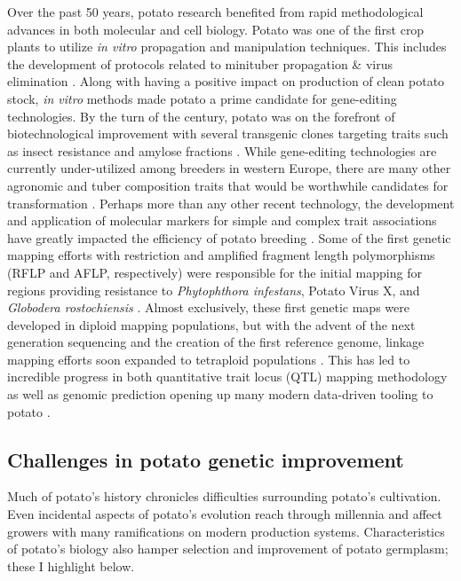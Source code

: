 \documentclass[
]{article}
\begin{document}
Over the past 50 years, potato research benefited from rapid
methodological advances in both molecular and cell biology. Potato was
one of the first crop plants to utilize \emph{in vitro} propagation and
manipulation techniques. This includes the development of protocols
related to minituber propagation \& virus elimination
\autocite{HUSSEY1981,Jones1994}. Along with having a positive impact on
production of clean potato stock, \emph{in vitro} methods made potato a
prime candidate for gene-editing technologies. By the turn of the
century, potato was on the forefront of biotechnological improvement
with several transgenic clones targeting traits such as insect
resistance and amylose fractions \autocite{Thornton2003,Karlsson2007}.
While gene-editing technologies are currently under-utilized among
breeders in western Europe, there are many other agronomic and tuber
composition traits that would be worthwhile candidates for
transformation \autocite{Millam2007}. Perhaps more than any other recent
technology, the development and application of molecular markers for
simple and complex trait associations have greatly impacted the
efficiency of potato breeding \autocite{Gebhardt2007}. Some of the first
genetic mapping efforts with restriction and amplified fragment length
polymorphisms (RFLP and AFLP, respectively) were responsible for the
initial mapping for regions providing resistance to \emph{Phytophthora
infestans}, Potato Virus X, and \emph{Globodera rostochiensis}
\autocite{Gebhardt1989,Gebhardt1993,Meksem1995}. Almost exclusively,
these first genetic maps were developed in diploid mapping populations,
but with the advent of the next generation sequencing and the creation
of the first reference genome, linkage mapping efforts soon expanded to
tetraploid populations
\autocite{Bradshaw2008,ThePotatoGenomeSequencingConsortium2011,Hackett2013}.
This has led to incredible progress in both quantitative trait locus
(QTL) mapping methodology as well as genomic prediction opening up many
modern data-driven tooling to potato
\autocite{Enciso-Rodriguez2018,Bourke2021,Pandey2022,Clot2024b}.

\subsection{Challenges in potato genetic
improvement}\label{challenges-in-potato-genetic-improvement}

Much of potato's history chronicles difficulties surrounding potato's
cultivation. Even incidental aspects of potato's evolution reach through
millennia and affect growers with many ramifications on modern
production systems. Characteristics of potato's biology also hamper
selection and improvement of potato germplasm; these I highlight below.
\end{document}
